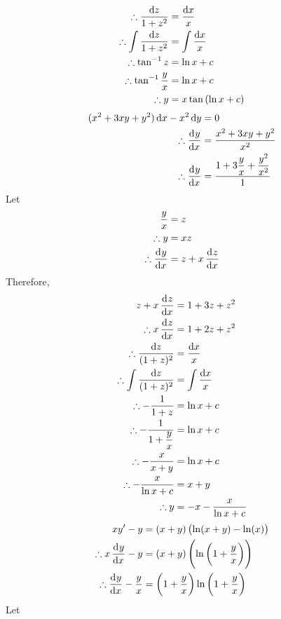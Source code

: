 \documentclass[fleqn, a4paper, 12pt, oneside]{amsart}
\theoremstyle{definition}
\theoremstyle{theorem}
\begin{document}
\begin{solution}
\begin{tasks}
\begin{align*}
				\therefore \dfrac{\dif z}{1 + z^2} &= \dfrac{\dif x}{x}\\
				\therefore \int \dfrac{\dif z}{1 + z^2} &= \int \dfrac{\dif x}{x}\\
				\therefore \tan^{-1} z &= \ln x + c\\
				\therefore \tan^{-1} \dfrac{y}{x} &= \ln x + c\\
				\therefore y &= x \tan \left( \ln x + c \right)
			\end{align*}
		\task
			\begin{align*}
				(x^2 + 3xy + y^2) \dif x - x^2 \dif y &= 0\\
				\therefore \dod{y}{x} &= \dfrac{x^2 + 3xy + y^2}{x^2}\\
				\therefore \dod{y}{x} &= \dfrac{1 + 3 \dfrac{y}{x} + \dfrac{y^2}{x^2}}{1}
			\end{align*}
			Let
			\begin{align*}
				\dfrac{y}{x} &= z\\
				\therefore y &= x z\\
				\therefore \dod{y}{x} &= z + x \dod{z}{x}
			\end{align*}
			Therefore,
			\begin{align*}
				z + x \dod{z}{x} &= 1 + 3z + z^2\\
				\therefore x \dod{z}{x} &= 1 + 2z + z^2\\
				\therefore \dfrac{\dif z}{(1 + z)^2} &= \dfrac{\dif x}{x}\\
				\therefore \int \dfrac{\dif z}{(1 + z)^2} &= \int \dfrac{\dif x}{x}\\
				\therefore -\dfrac{1}{1 + z} &= \ln x + c\\
				\therefore -\dfrac{1}{1 + \dfrac{y}{x}} &= \ln x + c\\
				\therefore -\dfrac{x}{x + y} &= \ln x + c\\
				\therefore -\dfrac{x}{\ln x + c} &= x + y\\
				\therefore y &= -x - \dfrac{x}{\ln x + c}
			\end{align*}
		\task
			\begin{align*}
				x y' - y &= (x + y)\left( \ln (x + y)  - \ln (x) \right)\\
				\therefore x \dod{y}{x} - y &= (x + y) \left( \ln \left( 1 + \dfrac{y}{x} \right) \right)\\
				\therefore \dod{y}{x} - \dfrac{y}{x} &= \left( 1 + \dfrac{y}{x} \right) \ln \left( 1 + \dfrac{y}{x} \right)
			\end{align*}
			Let
			\begin{align*}

\end{align*}
\end{tasks}
\end{solution}
\end{document}

